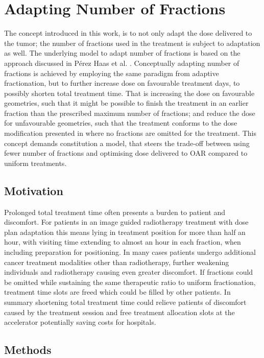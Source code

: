 \documentclass[\relativeRoot/ada.tex]{subfiles}
\begin{document}
\section{Adapting Number of Fractions}
The concept introduced in this work, is to not only adapt the dose delivered to the tumor; the number of fractions used in the treatment is subject to adaptation as well. The underlying model to adapt number of fractions is based on the approach discussed in Pérez Haas et al. \cite{perezhaas_adaptive}. Conceptually adapting number of fractions is achieved by employing the same paradigm from adaptive fractionation, but to further increase dose on favourable treatment days, to possibly shorten total treatment time. That is increasing the dose on favourable geometries, such that it might be possible to finish the treatment in an earlier fraction than the prescribed maximum number of fractions; and reduce the dose for unfavourable geometries, such that the treatment conforms to the dose modification presented in \cite{perezhaas_adaptive} where no fractions are omitted for the treatment. This concept demands constitution a model, that steers the trade-off between using fewer number of fractions and optimising dose delivered to OAR compared to uniform treatments.

\subsection{Motivation}
Prolonged total treatment time often presents a burden to patient and discomfort. For patients in an image guided radiotherapy treatment with dose plan adaptation this means lying in treatment position for more than half an hour, with visiting time extending to almost an hour in each fraction, when including preparation for positioning. In many cases patients undergo additional cancer treatment modalities other than radiotherapy, further weakening individuals and radiotherapy causing even greater discomfort. If fractions could be omitted while sustaining the same therapeutic ratio to uniform fractionation, treatment time slots are freed which could be filled by other patients. In summary shortening total treatment time could relieve patients of discomfort caused by the treatment session and free treatment allocation slots at the accelerator potentially saving costs for hospitals.

\subsection{Methods}
\end{document}
